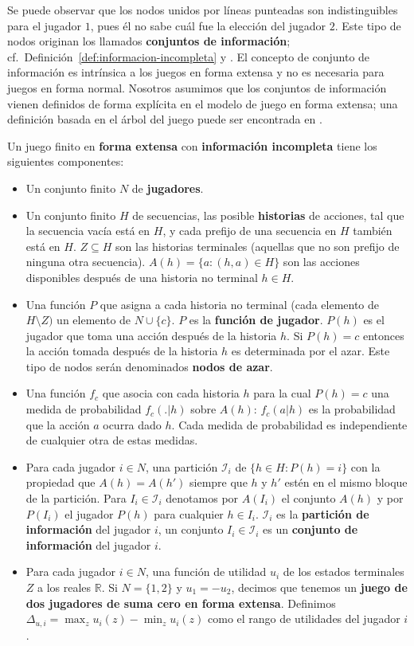 Se puede observar que los nodos unidos por líneas punteadas son indistinguibles para el jugador $1$, pues él no sabe cuál fue la elección del jugador $2$. Este tipo de nodos originan los llamados \textbf{conjuntos de información}; cf.\ Definición~\ref{def:informacion-incompleta} y \cite[p.~200]{bib:course-game-theory}. El concepto de conjunto de información es intrínsica a los juegos en forma extensa y no es necesaria para juegos en forma normal. Nosotros asumimos que los conjuntos de información vienen definidos de forma explícita en el modelo de juego en forma extensa; una definición basada en el árbol del juego puede ser encontrada en \cite{bib:conceptos-basicos}.

\begin{definition}
\label{def:informacion-incompleta}
Un juego finito en \textbf{forma extensa} con \textbf{información incompleta} tiene los siguientes componentes:
\begin{itemize}[]
  \item Un conjunto finito $N$ de \textbf{jugadores}.
  \item Un conjunto finito $H$ de secuencias, las posible \textbf{historias} de acciones, tal que la secuencia vacía está en $H$, y cada prefijo de una secuencia en $H$ también está en $H$. $Z \subseteq H$ son las historias terminales (aquellas que no son prefijo de ninguna otra secuencia). $A(h) = \{ a : (h, a) \in H \}$ son las acciones disponibles después de una historia no terminal $h \in H$.
  \item Una función $P$ que asigna a cada historia no terminal (cada elemento de $H \setminus Z)$ un elemento de $N \cup \{c \}$. $P$ es la \textbf{función de jugador}. $P(h)$ es el jugador que toma una acción después de la historia $h$. Si $P(h) = c$ entonces la acción tomada después de la historia $h$ es determinada por el azar. Este tipo de nodos serán denominados \textbf{nodos de azar}.
  \item Una función $f_c$ que asocia con cada historia $h$ para la cual $P(h) = c$ una medida de probabilidad $f_c(.|h)$ sobre $A(h)$: $f_c(a|h)$ es la probabilidad que la acción $a$ ocurra dado $h$.  Cada medida de probabilidad es independiente de cualquier otra de estas medidas.
  \item Para cada jugador $i \in N$, una partición $\mathcal{I}_i$ de $\{h \in H : P(h) = i\}$ con la propiedad que $A(h) = A(h')$ siempre que $h$ y $h'$ estén en el mismo bloque de la partición. Para $I_i \in \mathcal{I}_i$ denotamos por $A(I_i)$ el conjunto $A(h)$ y por $P(I_i)$ el jugador $P(h)$ para cualquier $h \in I_i$. $\mathcal{I}_i$ es la \textbf{partición de información} del jugador $i$, un conjunto $I_i \in \mathcal{I}_i$ es un \textbf{conjunto de información} del jugador $i$.
  \item Para cada jugador $i \in N$, una función de utilidad $u_i$ de los estados terminales $Z$ a los reales $\mathbb{R}$. Si $N = \{1,2\}$ y $u_1 = -u_2$, decimos que tenemos un \textbf{juego de dos jugadores de suma cero en forma extensa}. Definimos $\Delta_{u,i} = \max_z u_i(z) - \min_z u_i(z)$ como el rango de utilidades del jugador $i$.
\end{itemize}
\end{definition}

